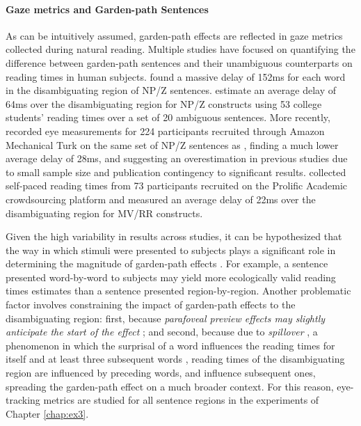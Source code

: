 \documentclass[a4paper, nobind]{templates/ociamthesis}
\begin{document}
\paragraph{Gaze metrics and Garden-path Sentences} As can be intuitively assumed, garden-path effects are reflected in gaze metrics collected during natural reading. Multiple studies have focused on quantifying the difference between garden-path sentences and their unambiguous counterparts on reading times in human subjects. \textcite{sturt-etal-1999-structural} found a massive delay of 152ms for each word in the disambiguating region of NP/Z sentences. \textcite{grodner-etal-2003-against} estimate an average delay of 64ms over the disambiguating region for NP/Z constructs using 53 college students' reading times over a set of 20 ambiguous sentences. More recently, \textcite{prasad-linzen-2019-much} recorded eye measurements for 224 participants recruited through Amazon Mechanical Turk on the same set of NP/Z sentences as \textcite{grodner-etal-2003-against}, finding a much lower average delay of 28ms, and suggesting an overestimation in previous studies due to small sample size and publication contingency to significant results. \textcite{prasad-linzen-2019-self} collected self-paced reading times from 73 participants recruited on the Prolific Academic crowdsourcing platform and measured an average delay of 22ms over the disambiguating region for MV/RR constructs.

Given the high variability in results across studies, it can be hypothesized that the way in which stimuli were presented to subjects plays a significant role in determining the magnitude of garden-path effects \autocite{schjindel-linzen-2018-modeling}. For example, a sentence presented word-by-word to subjects may yield more ecologically valid reading times estimates than a sentence presented region-by-region. Another problematic factor involves constraining the impact of garden-path effects to the disambiguating region: first, because \emph{parafoveal preview effects may slightly anticipate the start of the effect} \autocites{schotter-2012-parafoveal}{schotter-2018-reading}; and second, because due to \emph{spillover} \autocite{mitchell-1984-evaluation}, a phenomenon in which the surprisal of a word influences the reading times for itself and at least three subsequent words \autocite{smith-levy-2013-effect}, reading times of the disambiguating region are influenced by preceding words, and influence subsequent ones, spreading the garden-path effect on a much broader context. For this reason, eye-tracking metrics are studied for all sentence regions in the experiments of Chapter \ref{chap:ex3}.
\end{document}
